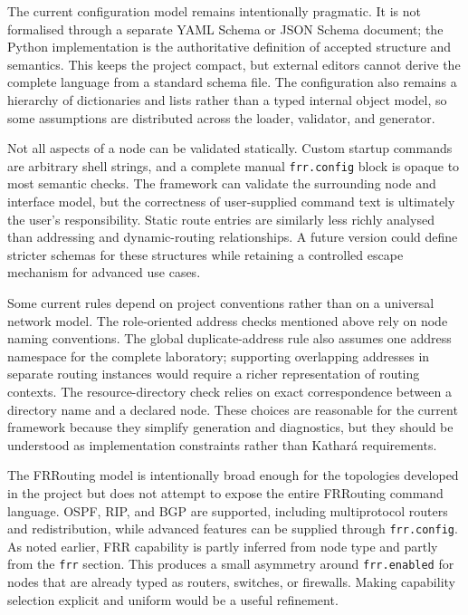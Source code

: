 The current configuration model remains intentionally pragmatic. It is not
formalised through a separate YAML Schema or JSON Schema document; the Python
implementation is the authoritative definition of accepted structure and
semantics. This keeps the project compact, but external editors cannot derive
the complete language from a standard schema file. The configuration also
remains a hierarchy of dictionaries and lists rather than a typed internal
object model, so some assumptions are distributed across the loader, validator,
and generator.

Not all aspects of a node can be validated statically. Custom startup commands
are arbitrary shell strings, and a complete manual \texttt{frr.config} block is
opaque to most semantic checks. The framework can validate the surrounding
node and interface model, but the correctness of user-supplied command text is
ultimately the user's responsibility. Static route entries are similarly less
richly analysed than addressing and dynamic-routing relationships. A future
version could define stricter schemas for these structures while retaining a
controlled escape mechanism for advanced use cases.

Some current rules depend on project conventions rather than on a universal
network model. The role-oriented address checks mentioned above rely on node
naming conventions. The global duplicate-address rule also assumes one address
namespace for the complete laboratory; supporting overlapping addresses in
separate routing instances would require a richer representation of routing
contexts. The resource-directory check relies on exact correspondence between
a directory name and a declared node. These choices are reasonable for the
current framework because they simplify generation and diagnostics, but they
should be understood as implementation constraints rather than Kathar\'a
requirements.

The FRRouting model is intentionally broad enough for the topologies developed
in the project but does not attempt to expose the entire FRRouting command
language. OSPF, RIP, and BGP are supported, including multiprotocol routers and
redistribution, while advanced features can be supplied through
\texttt{frr.config}. As noted earlier, FRR capability is partly inferred from
node type and partly from the \texttt{frr} section. This produces a small
asymmetry around \texttt{frr.enabled} for nodes that are already typed as
routers, switches, or firewalls. Making capability selection explicit and
uniform would be a useful refinement.


